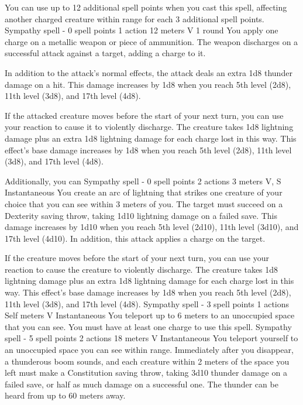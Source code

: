         You can use up to 12 additional spell points when you cast this spell, affecting another charged creature within range for each 3 additional spell points.
        {Sympathy spell - 0 spell points}
        {1 action}
        {12 meters}
        {V}
        {1 round}
        You apply one charge on a metallic weapon or piece of ammunition.
        The weapon discharges on a successful attack against a target, adding a charge to it.

        In addition to the attack's normal effects, the attack deals an extra 1d8 thunder damage on a hit.
        This damage increases by 1d8 when you reach 5th level (2d8), 11th level (3d8), and 17th level (4d8).

        If the attacked creature moves before the start of your next turn, you can use your reaction to cause it to violently discharge.
        The creature takes 1d8 lightning damage plus an extra 1d8 lightning damage for each charge lost in this way.
        This effect's base damage increases by 1d8 when you reach 5th level (2d8), 11th level (3d8), and 17th level (4d8).

        Additionally, you can
        {Sympathy spell - 0 spell points}
        {2 actions}
        {3 meters}
        {V, S}
        {Instantaneous}
        You create an arc of lightning that strikes one creature of your choice that you can see within 3 meters of you.
        The target must succeed on a Dexterity saving throw, taking 1d10 lightning damage on a failed save.
        This damage increases by 1d10 when you reach 5th level (2d10), 11th level (3d10), and 17th level (4d10).
        In addition, this attack applies a charge on the target.

        If the creature moves before the start of your next turn, you can use your reaction to cause the creature to violently discharge.
        The creature takes 1d8 lightning damage plus an extra 1d8 lightning damage for each charge lost in this way.
        This effect's base damage increases by 1d8 when you reach 5th level (2d8), 11th level (3d8), and 17th level (4d8).
        {Sympathy spell - 3 spell points}
        {1 actions}
        {Self meters}
        {V}
        {Instantaneous}
        You teleport up to 6 meters to an unoccupied space that you can see.
        You must have at least one charge to use this spell.
        {Sympathy spell - 5 spell points}
        {2 actions}
        {18 meters}
        {V}
        {Instantaneous}
        You teleport yourself to an unoccupied space you can see within range.
        Immediately after you disappear, a thunderous boom sounds, and each creature within 2 meters of the space you left must make a Constitution saving throw, taking 3d10 thunder damage on a failed save, or half as much damage on a successful one.
        The thunder can be heard from up to 60 meters away.

